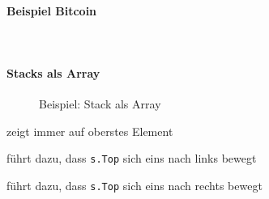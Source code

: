 \documentclass[
    ngerman,
    color=3b,
    dark_mode,
    load_common, %
    summary,
    boxarc,
]{rubos-tuda-template}
\begin{document}
\paragraph{Beispiel Bitcoin}\mbox{}\\

\clearpage
\paragraph{Stacks als Array}\mbox{}
\begin{figure}[ht]
    \centering
    
    \caption{Beispiel: Stack als Array}
\end{figure}
\begin{description}[leftmargin=3cm,itemsep=1em]
    \item [\texttt{s.top}] zeigt immer auf oberstes Element
    \item [\texttt{pop()}] führt dazu, dass \texttt{s.Top} sich eins nach links bewegt
    \item [\texttt{push(k)}] führt dazu, dass \texttt{s.Top} sich eins nach rechts bewegt
\end{description}
\end{document}
